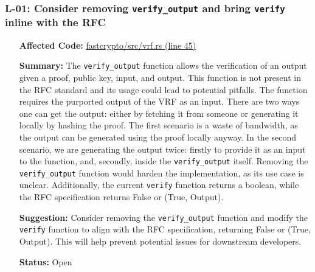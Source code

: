\subsubsection*{L-01: Consider removing \lstinline{verify_output} and bring \lstinline{verify} inline with the RFC}
\begin{itemize}[align=left]
    \item[\textbf{Affected Code:}] \href{https://github.com/MystenLabs/fastcrypto/blob/963205c6d0538fe548b8b10037cf87a53af6f424/fastcrypto/src/vrf.rs#L45}{fastcrypto/src/vrf.rs (line 45)}
    \item[\textbf{Summary:}] The \lstinline{verify_output} function allows the verification of an output given a proof, public key, input, and output. This function is not present in the RFC standard and its usage could lead to potential pitfalls. The function requires the purported output of the VRF as an input. There are two ways one can get the output: either by fetching it from someone or generating it locally by hashing the proof. The first scenario is a waste of bandwidth, as the output
    can be generated using the proof locally anyway. In the second scenario, we are generating the output twice: firstly to provide it as an input to the function, and, secondly, inside the \lstinline{verify_output} itself. Removing the \lstinline{verify_output} function would harden the implementation, as its use case is unclear. Additionally, the current \lstinline{verify} function returns a boolean, while the RFC specification returns False or (True, Output).
    \item[\textbf{Suggestion:}] Consider removing the \lstinline{verify_output} function and modify the \lstinline{verify} function to align with the RFC specification, returning False or (True, Output). This will help prevent potential issues for downstream developers.
    \item[\textbf{Status:}] Open
\end{itemize}

